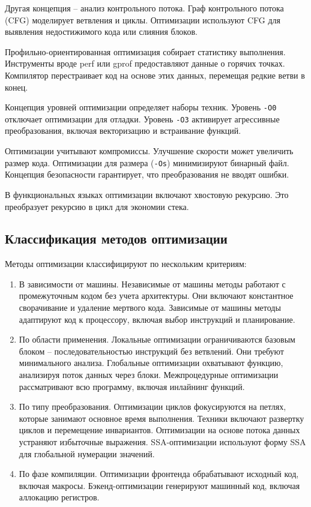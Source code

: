 Другая концепция -- анализ контрольного потока. Граф контрольного потока (CFG) моделирует ветвления и циклы. Оптимизации используют CFG для выявления недостижимого кода или слияния блоков.

Профильно-ориентированная оптимизация собирает статистику выполнения. Инструменты вроде perf или gprof предоставляют данные о горячих точках. Компилятор перестраивает код на основе этих данных, перемещая редкие ветви в конец.

Концепция уровней оптимизации определяет наборы техник. Уровень \texttt{-O0} отключает оптимизации для отладки. Уровень \texttt{-O3} активирует агрессивные преобразования, включая векторизацию и встраивание функций.

Оптимизации учитывают компромиссы. Улучшение скорости может увеличить размер кода. Оптимизации для размера (\texttt{-Os}) минимизируют бинарный файл. Концепция безопасности гарантирует, что преобразования не вводят ошибки.

В функциональных языках оптимизации включают хвостовую рекурсию. Это преобразует рекурсию в цикл для экономии стека.

\subsection{Классификация методов оптимизации}

Методы оптимизации классифицируют по нескольким критериям:

\begin{enumerate}
\item В зависимости от машины. Независимые от машины методы работают с промежуточным кодом без учета архитектуры. Они включают константное сворачивание и удаление мертвого кода. Зависимые от машины методы адаптируют код к процессору, включая выбор инструкций и планирование.
\item По области применения. Локальные оптимизации ограничиваются базовым блоком -- последовательностью инструкций без ветвлений. Они требуют минимального анализа. Глобальные оптимизации охватывают функцию, анализируя поток данных через блоки. Межпроцедурные оптимизации рассматривают всю программу, включая инлайнинг функций.
\item По типу преобразования. Оптимизации циклов фокусируются на петлях, которые занимают основное время выполнения. Техники включают развертку циклов и перемещение инвариантов. Оптимизации на основе потока данных устраняют избыточные выражения. SSA-оптимизации используют форму SSA для глобальной нумерации значений.
\item По фазе компиляции. Оптимизации фронтенда обрабатывают исходный код, включая макросы. Бэкенд-оптимизации генерируют машинный код, включая аллокацию регистров.
\end{enumerate}

